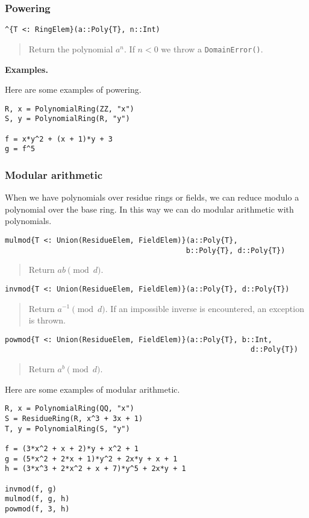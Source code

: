 \documentclass[a4paper,10pt]{article}
\newcommand{\code}{\lstinline}
\newcommand{\desc}[1]{\vspace{-3mm}\begin{quote}#1\end{quote}}
\begin{document}
\subsubsection{Powering}

\begin{lstlisting}
^{T <: RingElem}(a::Poly{T}, n::Int)
\end{lstlisting}

\desc{Return the polynomial $a^n$. If $n < 0$ we throw a \code{DomainError()}.}

\textbf{Examples.}

Here are some examples of powering.

\begin{lstlisting}
R, x = PolynomialRing(ZZ, "x")
S, y = PolynomialRing(R, "y")

f = x*y^2 + (x + 1)*y + 3
g = f^5
\end{lstlisting}

\subsubsection{Modular arithmetic}

When we have polynomials over residue rings or fields, we can reduce modulo
a polynomial over the base ring. In this way we can do modular arithmetic with
polynomials.

\begin{lstlisting}
mulmod{T <: Union(ResidueElem, FieldElem)}(a::Poly{T}, 
                                          b::Poly{T}, d::Poly{T})
\end{lstlisting}

\desc{Return $ab \pmod{d}$.}

\begin{lstlisting}
invmod{T <: Union(ResidueElem, FieldElem)}(a::Poly{T}, d::Poly{T})
\end{lstlisting}

\desc{Return $a^{-1} \pmod{d}$. If an impossible inverse is encountered, an
exception is thrown.}

\begin{lstlisting}
powmod{T <: Union(ResidueElem, FieldElem)}(a::Poly{T}, b::Int, 
                                                         d::Poly{T})
\end{lstlisting}

\desc{Return $a^b \pmod{d}$.}

Here are some examples of modular arithmetic.

\begin{lstlisting}
R, x = PolynomialRing(QQ, "x")
S = ResidueRing(R, x^3 + 3x + 1)
T, y = PolynomialRing(S, "y")

f = (3*x^2 + x + 2)*y + x^2 + 1
g = (5*x^2 + 2*x + 1)*y^2 + 2x*y + x + 1
h = (3*x^3 + 2*x^2 + x + 7)*y^5 + 2x*y + 1

invmod(f, g)
mulmod(f, g, h)
powmod(f, 3, h)
\end{lstlisting}
\end{document}

